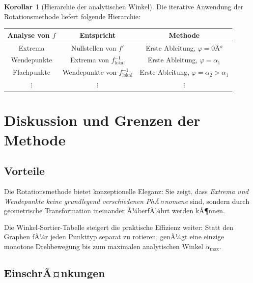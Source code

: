 ﻿\documentclass[12pt, a4paper]{article}
\theoremstyle{definition}
\newtheorem{korollar}{Korollar}[section]
\begin{document}
	\begin{korollar}[Hierarchie der analytischen Winkel]
		Die iterative Anwendung der Rotationsmethode liefert folgende Hierarchie:
		
		\begin{center}
			\begin{tabular}{ccc}
				\toprule
				\textbf{Analyse von $f$} & \textbf{Entspricht} & \textbf{Methode} \\
				\midrule
				Extrema & Nullstellen von $f'$ & Erste Ableitung, $\varphi=0Â°$ \\
				Wendepunkte & Extrema von $f^{-1}_\mathrm{lokal}$ & Erste Ableitung, $\varphi = \alpha_1$ \\
				Flachpunkte & Wendepunkte von $f^{-1}_\mathrm{lokal}$ & Erste Ableitung, $\varphi = \alpha_2 > \alpha_1$ \\
				$\vdots$ & $\vdots$ & $\vdots$ \\
				\bottomrule
			\end{tabular}
		\end{center}
	\end{korollar}
	
	\section{Diskussion und Grenzen der Methode}
	
	\subsection{Vorteile}
	
	Die Rotationsmethode bietet konzeptionelle Eleganz: Sie zeigt, dass
	\emph{Extrema und Wendepunkte keine grundlegend verschiedenen PhÃ¤nomene}
	sind, sondern durch geometrische Transformation ineinander Ã¼berfÃ¼hrt werden
	kÃ¶nnen.
	
	Die Winkel-Sortier-Tabelle steigert die praktische Effizienz weiter: Statt
	den Graphen fÃ¼r jeden Punkttyp separat zu rotieren, genÃ¼gt eine einzige
	monotone Drehbewegung bis zum maximalen analytischen Winkel $\alpha_{\max}$.
	
	\subsection{EinschrÃ¤nkungen}
	
\end{document}
